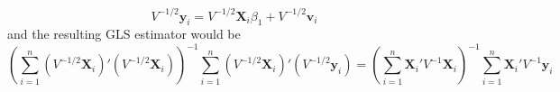 \[
V^{-1/2}\mathbf{y}_ i = V^{-1/2}\mathbf{X}_i\beta_1 + V^{-1/2}\mathbf{v}_i
\]
and the resulting GLS estimator would be
\[
\left(\sum_{i=1}^n (V^{-1/2}\mathbf{X}_i)'(V^{-1/2}\mathbf{X}_i)\right)^{-1}\sum_{i=1}^n (V^{-1/2}\mathbf{X}_i)'(V^{-1/2}\mathbf{y}_i)=\left(\sum_{i=1}^n \mathbf{X}_i'V^{-1}\mathbf{X}_i\right)^{-1}\sum_{i=1}^n \mathbf{X}_i'V^{-1}\mathbf{y}_i
\]
\begin{mdframed}[backgroundcolor=yellow!5] 
\begin{comment}[So when do we use fixed effects vs. random effects?]
One way of figuring out when to use random effect is through a Hausmann Test. Random effects can be considered as a special case of fixed effects. In this test, the null hypothesis would be random effects and the alternative would be fixed effects. Note that the ingredients we have here are similar to the Hausmann Test in the endogeneity test. Random effects estimators would only be consistent if $H_0$ is true whereas fixed effects are consistent in both $H_0$ and $H_1$. If you are planning to use the random
effects estimator (and believe that the random effects assumptions are appropriate in your context), the Hausmann test can be used as a specification check for this assumption and provide evidence to support your approach.
\end{comment}
\end{mdframed}


